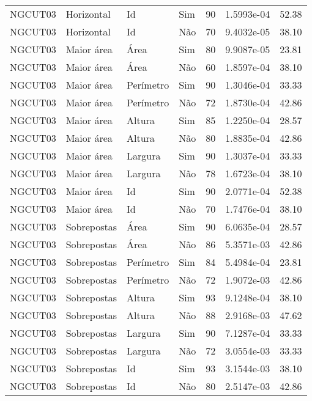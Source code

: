 \begin{tabular}{llllrrr}
    NGCUT03   & Horizontal  & Id        & Sim         & 90           & 1.5993e-04 & 52.38    \\
    NGCUT03   & Horizontal  & Id        & Não         & 70           & 9.4032e-05 & 38.10    \\
    NGCUT03   & Maior área  & Área      & Sim         & 80           & 9.9087e-05 & 23.81    \\
    NGCUT03   & Maior área  & Área      & Não         & 60           & 1.8597e-04 & 38.10    \\
    NGCUT03   & Maior área  & Perímetro & Sim         & 90           & 1.3046e-04 & 33.33    \\
    NGCUT03   & Maior área  & Perímetro & Não         & 72           & 1.8730e-04 & 42.86    \\
    NGCUT03   & Maior área  & Altura    & Sim         & 85           & 1.2250e-04 & 28.57    \\
    NGCUT03   & Maior área  & Altura    & Não         & 80           & 1.8835e-04 & 42.86    \\
    NGCUT03   & Maior área  & Largura   & Sim         & 90           & 1.3037e-04 & 33.33    \\
    NGCUT03   & Maior área  & Largura   & Não         & 78           & 1.6723e-04 & 38.10    \\
    NGCUT03   & Maior área  & Id        & Sim         & 90           & 2.0771e-04 & 52.38    \\
    NGCUT03   & Maior área  & Id        & Não         & 70           & 1.7476e-04 & 38.10    \\
    NGCUT03   & Sobrepostas & Área      & Sim         & 90           & 6.0635e-04 & 28.57    \\
    NGCUT03   & Sobrepostas & Área      & Não         & 86           & 5.3571e-03 & 42.86    \\
    NGCUT03   & Sobrepostas & Perímetro & Sim         & 84           & 5.4984e-04 & 23.81    \\
    NGCUT03   & Sobrepostas & Perímetro & Não         & 72           & 1.9072e-03 & 42.86    \\
    NGCUT03   & Sobrepostas & Altura    & Sim         & 93           & 9.1248e-04 & 38.10    \\
    NGCUT03   & Sobrepostas & Altura    & Não         & 88           & 2.9168e-03 & 47.62    \\
    NGCUT03   & Sobrepostas & Largura   & Sim         & 90           & 7.1287e-04 & 33.33    \\
    NGCUT03   & Sobrepostas & Largura   & Não         & 72           & 3.0554e-03 & 33.33    \\
    NGCUT03   & Sobrepostas & Id        & Sim         & 93           & 3.1544e-03 & 38.10    \\
    NGCUT03   & Sobrepostas & Id        & Não         & 80           & 2.5147e-03 & 42.86    \\
    \hline
\end{tabular}